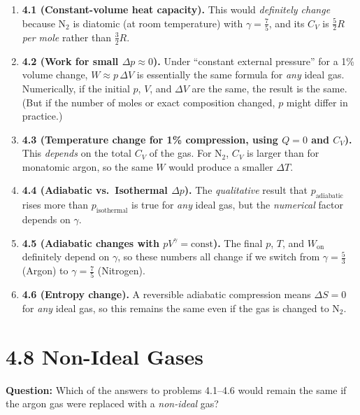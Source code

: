 \documentclass[12pt]{article}
\theoremstyle{definition} %
\theoremstyle{plain} %
\begin{document}
\begin{enumerate}
\item \textbf{4.1 (Constant-volume heat capacity).} 
  This would \emph{definitely change} because $\mathrm{N_2}$ is diatomic (at room temperature) with 
  \(\gamma = \tfrac{7}{5}\), and its $C_V$ is $\tfrac{5}{2}R$ \emph{per mole} rather than $\tfrac{3}{2}R$.

\item \textbf{4.2 (Work for small $\Delta p\approx 0$).}  
  Under “constant external pressure” for a 1\% volume change, $W \approx p\,\Delta V$ is essentially the same formula for \emph{any} ideal gas.  Numerically, if the initial $p$, $V$, and $\Delta V$ are the same, the result is the same.  (But if the number of moles or exact composition changed, $p$ might differ in practice.)

\item \textbf{4.3 (Temperature change for 1\% compression, using $Q=0$ and $C_V$).}  
  This \emph{depends} on the total $C_V$ of the gas.  For $\mathrm{N_2}$, $C_V$ is larger than for monatomic argon, so the same $W$ would produce a smaller $\Delta T$.  

\item \textbf{4.4 (Adiabatic vs.\ Isothermal $\Delta p$).}  
  The \emph{qualitative} result that $p_{\text{adiabatic}}$ rises more than $p_{\text{isothermal}}$ is true for \emph{any} ideal gas, but the \emph{numerical} factor depends on $\gamma$.

\item \textbf{4.5 (Adiabatic changes with $pV^\gamma=\text{const}$).}  
  The final $p$, $T$, and $W_{\text{on}}$ definitely depend on $\gamma$, so these numbers all change if we switch from $\gamma=\tfrac{5}{3}$ (Argon) to $\gamma=\tfrac{7}{5}$ (Nitrogen).

\item \textbf{4.6 (Entropy change).}  
  A reversible adiabatic compression means $\Delta S=0$ for \emph{any} ideal gas, so this remains the same even if the gas is changed to $\mathrm{N_2}$.
\end{enumerate}

\section*{4.8 Non-Ideal Gases}

\noindent
\textbf{Question:} Which of the answers to problems 4.1--4.6 would remain the same if the argon gas were replaced with a \emph{non-ideal} gas?
\end{document}
